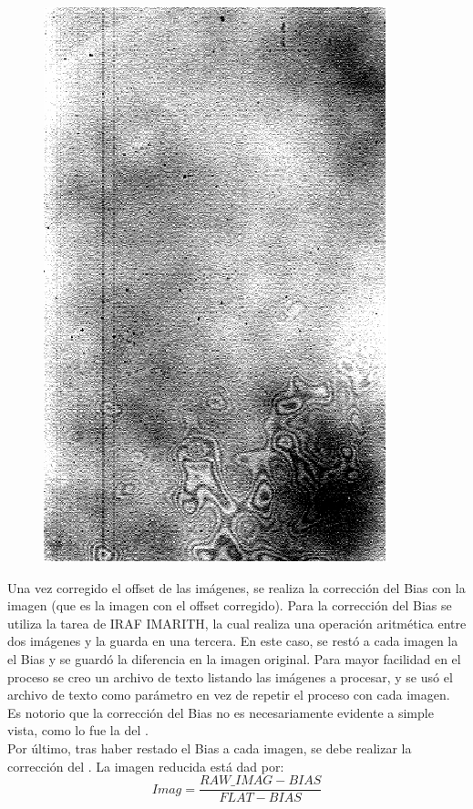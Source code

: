 \documentclass[12pt]{article}
\begin{document}
\begin{figure}[H]
  \centering
   \includegraphics[scale= 0.5]{im03.png}
  \label{im03}
\end{figure}

Una vez corregido el offset de las imágenes, se realiza la corrección del Bias con la imagen  (que es la imagen  con el offset corregido). Para la corrección del Bias se utiliza la tarea de IRAF IMARITH, la cual realiza una operación aritmética entre dos imágenes y la guarda en una tercera. En este caso, se restó a cada imagen la el Bias  y se guardó la diferencia en la imagen original. Para mayor facilidad en el proceso se creo un archivo de texto listando las imágenes a procesar, y se usó el archivo de texto como parámetro en vez de repetir el proceso con cada imagen. Es notorio que la corrección del Bias no es necesariamente evidente a simple vista, como lo fue la del .\\

Por último, tras haber restado el Bias a cada imagen, se debe realizar la corrección del .
La imagen reducida está dad por:
\begin{equation}
Imag = \frac{RAW\_IMAG - BIAS}{FLAT - BIAS}
\label{unica}
\end{equation}
\end{document}
